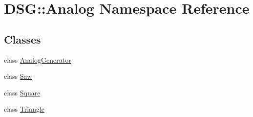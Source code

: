 \hypertarget{namespaceDSG_1_1Analog}{\section{D\-S\-G\-:\-:Analog Namespace Reference}
\label{namespaceDSG_1_1Analog}
}
\subsection*{Classes}
\begin{DoxyCompactItemize}
\item 
class \hyperlink{classDSG_1_1Analog_1_1AnalogGenerator}{Analog\-Generator}
\item 
class \hyperlink{classDSG_1_1Analog_1_1Saw}{Saw}
\item 
class \hyperlink{classDSG_1_1Analog_1_1Square}{Square}
\item 
class \hyperlink{classDSG_1_1Analog_1_1Triangle}{Triangle}
\end{DoxyCompactItemize}
